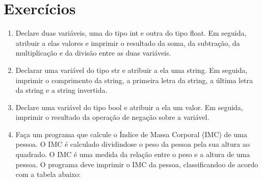 \documentclass[letterpaper,10pt,english]{jupyterBook}
\begin{document}
\section{Exercícios}
\label{\detokenize{chapters/ch2/ch2:exercicios}}\begin{enumerate}
%
\item {} 
\sphinxAtStartPar
Declare duas variáveis, uma do tipo int e
outra do tipo float. Em seguida, atribuir a elas valores e imprimir o resultado da soma, da subtração, da multiplicação e da divisão entre as duas variáveis.

\item {} 
\sphinxAtStartPar
Declarar uma variável do tipo str e atribuir a ela uma string. Em seguida, imprimir o comprimento da string, a primeira letra da string, a última letra da string e a string invertida.

\item {} 
\sphinxAtStartPar
Declare uma variável do tipo bool e atribuir a ela um valor. Em seguida, imprimir o resultado da operação de negação sobre a variável.

\item {} 
\sphinxAtStartPar
Faça um programa que calcule o Índice de Massa Corporal (IMC) de uma pessoa. O IMC é calculado dividindo\sphinxhyphen{}se o peso da pessoa pela sua altura ao quadrado. O IMC é uma medida da relação entre o peso e a altura de uma pessoa.
O programa deve imprimir o IMC da pessoa, classificando\sphinxhyphen{}o de acordo com a tabela abaixo:

\end{enumerate}
\end{document}

